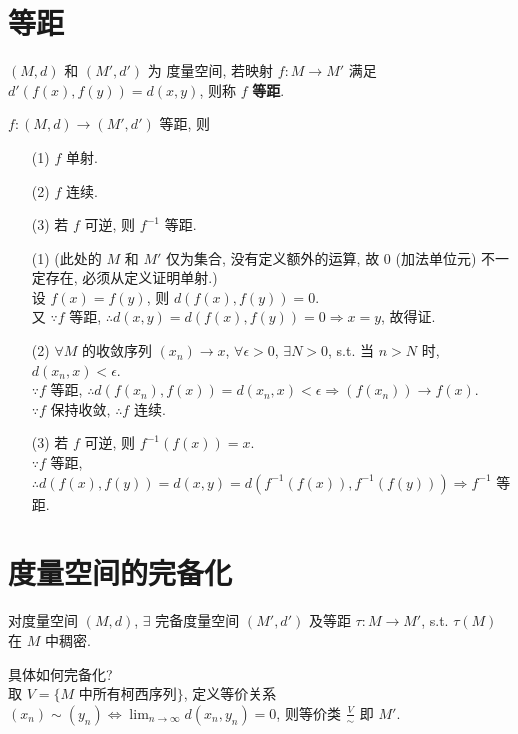\documentclass{note}
\begin{document}
\section{等距}
\begin{df}[等距]
    $(M,d)$ 和 $(M',d')$ 为 度量空间, 若映射 $f:M\rightarrow M'$ 满足 $d'(f(x),f(y))=d(x,y)$, 则称 $f$ \textbf{等距}.
\end{df}

\begin{thm}
    $f:(M,d)\rightarrow(M',d')$ 等距, 则
    \begin{itemize}
        \item[(1)] $f$ 单射.
        \item[(2)] $f$ 连续.
        \item[(3)] 若 $f$ 可逆, 则 $f^{-1}$ 等距.
    \end{itemize}
\end{thm}
\begin{pf}
    \begin{itemize}
        \item[(1)] (此处的 $M$ 和 $M'$ 仅为集合, 没有定义额外的运算, 故 $0$ (加法单位元) 不一定存在, 必须从定义证明单射.)\\
        设 $f(x)=f(y)$, 则 $d(f(x),f(y))=0$.\\
        又 $\because f$ 等距, $\therefore d(x,y)=d(f(x),f(y))=0\Longrightarrow x=y$, 故得证.
        \item[(2)] $\forall M$ 的收敛序列 $(x_n)\rightarrow x$, $\forall\epsilon>0$, $\exists N>0$, s.t. 当 $n>N$ 时, $d(x_n,x)<\epsilon$.\\
        $\because f$ 等距, $\therefore d(f(x_n),f(x))=d(x_n,x)<\epsilon\Longrightarrow(f(x_n))\rightarrow f(x)$.\\
        $\because f$ 保持收敛, $\therefore f$ 连续.
        \item[(3)] 若 $f$ 可逆, 则 $f^{-1}(f(x))=x$.\\
        $\because f$ 等距, $\therefore d(f(x),f(y))=d(x,y)=d(f^{-1}(f(x)),f^{-1}(f(y)))\Longrightarrow f^{-1}$ 等距.
    \end{itemize}
\end{pf}

\section{度量空间的完备化}
\begin{thm}
    对度量空间 $(M,d)$, $\exists$ 完备度量空间 $(M',d')$ 及等距 $\tau:M\rightarrow M'$, s.t. $\tau(M)$ 在 $M$ 中稠密.
\end{thm}

具体如何完备化?\\
取 $V=\{M\text{ 中所有柯西序列}\}$, 定义等价关系 $(x_n)\sim(y_n)\Longleftrightarrow\lim_{n\rightarrow\infty}d(x_n,y_n)=0$, 则等价类 $\frac{V}{\sim}$ 即 $M'$.
\ifx\allfiles\undefined
\end{document}
